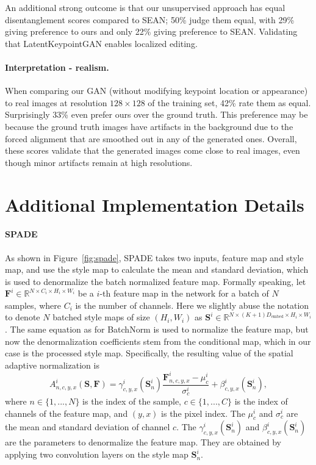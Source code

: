 \documentclass[10pt, conference, compsocconf]{IEEEtran}
\newcommand{\myR}{\mathbb{R}}
\newcommand{\mF}{\mathbf{F}}
\newcommand{\mS}{\mathbf{S}}
\begin{document}
An additional strong outcome is that our unsupervised approach has equal disentanglement scores compared to SEAN; 50\% judge them equal, with 29\% giving preference to ours and only 22\% giving preference to SEAN. Validating that LatentKeypointGAN enables localized editing.

\paragraph{Interpretation - realism.} When comparing our GAN (without modifying keypoint location or appearance) to real images at resolution $128\times128$ of the training set, 42\% rate them as equal. Surprisingly 33\% even prefer ours over the ground truth. This preference may be because the ground truth images have artifacts in the background due to the forced alignment that are smoothed out in any of the generated ones. Overall, these scores validate that the generated images come close to real images, even though minor artifacts remain at high resolutions.
 \section{Additional Implementation Details} \label{supp:archi_details}

\paragraph{SPADE} \cite{park2019semantic} As shown in Figure~\ref{fig:spade}, SPADE takes two inputs, feature map and style map, and use the style map to calculate the mean and standard deviation, which is used to denormalize the batch normalized feature map. Formally speaking, let $\mF^i\in\myR^{N\times C_i\times H_i\times W_i}$ be a $i$-th feature map in the network for a batch of $N$ samples, where $C_i$ is the number of channels. Here we slightly abuse the notation to denote $N$ batched style maps of size $(H_i,W_i)$ as $\mS^i\in\myR^{N\times (K+1)D_\text{embed}\times H_i\times W_i}$. The same equation as for BatchNorm \cite{ioffe2015batch} is used to normalize the feature map, but now the denormalization coefficients stem from the conditional map, which in our case is the processed style map. Specifically, the resulting value of the spatial adaptive normalization is
\begin{equation}
A^i_{n,c,y,x}(\mS,\mF) =    \gamma^i_{c,y,x}(\mS^i_n)\frac{\mF^i_{n,c,y,x}-\mu^i_c}{\sigma^i_c}+\beta^i_{c,y,x}(\mS^i_n),
\end{equation}
where $n\in\{1,...,N\}$ is the index of the sample, $c\in\{1,...,C\}$ is the index of channels of the feature map, and $(y,x)$ is the pixel index. 
The $\mu^i_c$ and $\sigma^i_c$ are the mean and standard deviation of channel $c$.
The $\gamma^i_{c,y,x}(\mS^i_n)$ and $\beta^i_{c,y,x}(\mS^i_n)$ are the parameters to denormalize the feature map. They are obtained by applying two convolution layers on the style map $\mS^i_n$.
\end{document}
